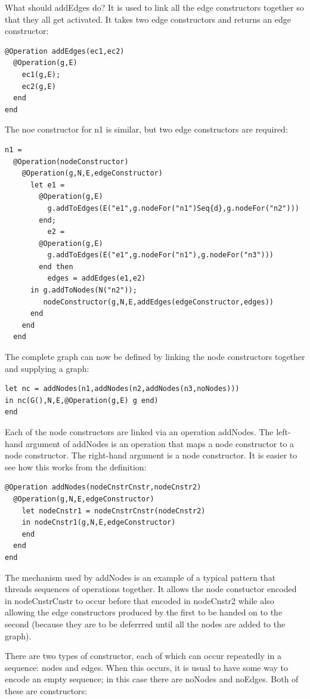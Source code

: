 What should addEdges do? It is used to link all the edge constructors
together so that they all get activated. It takes two edge constructors
and returns an edge constructor:

\begin{lstlisting}
@Operation addEdges(ec1,ec2)
  @Operation(g,E)
    ec1(g,E);
    ec2(g,E)
  end
end
\end{lstlisting}The noe constructor for n1 is similar, but two edge constructors are
required:

\begin{lstlisting}
n1 =
  @Operation(nodeConstructor)
    @Operation(g,N,E,edgeConstructor)
      let e1 = 
        @Operation(g,E)
          g.addToEdges(E("e1",g.nodeFor("n1")Seq{d},g.nodeFor("n2")))
        end;
          e2 = 
        @Operation(g,E)
          g.addToEdges(E("e1",g.nodeFor("n1"),g.nodeFor("n3")))
        end then
          edges = addEdges(e1,e2)
      in g.addToNodes(N("n2"));
         nodeConstructor(g,N,E,addEdges(edgeConstructor,edges))
      end
    end
  end
\end{lstlisting}The complete graph can now be defined by linking the node constructors
together and supplying a graph:

\begin{lstlisting}
let nc = addNodes(n1,addNodes(n2,addNodes(n3,noNodes)))
in nc(G(),N,E,@Operation(g,E) g end)
end
\end{lstlisting}Each of the node constructors are linked via an operation addNodes.
The left-hand argument of addNodes is an operation that maps a node
constructor to a node constructor. The right-hand argument is a node
constructor. It is easier to see how this works from the definition:

\begin{lstlisting}
@Operation addNodes(nodeCnstrCnstr,nodeCnstr2)
  @Operation(g,N,E,edgeConstructor)
    let nodeCnstr1 = nodeCnstrCnstr(nodeCnstr2)
    in nodeCnstr1(g,N,E,edgeConstructor)
    end
  end
end
\end{lstlisting}The mechanism used by addNodes is an example of a typical pattern
that threads sequences of operations together. It allows the node
constuctor encoded in nodeCnstrCnstr to occur before that encoded
in nodeCnstr2 while also allowing the edge constructors produced by
the first to be handed on to the second (because they are to be deferrred
until all the nodes are added to the graph).

There are two types of constructor, each of which can occur repeatedly
in a sequence: nodes and edges. When this occurs, it is usual to have
some way to encode an empty sequence; in this case there are noNodes
and noEdges. Both of these are constructors:


